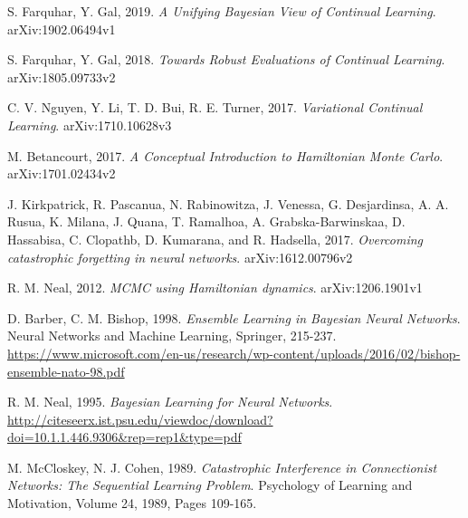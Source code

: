 \documentclass[a4paper,11pt]{article}
\begin{document}
 

\newpage
\begin{thebibliography}{8}

 S. Farquhar, Y. Gal, 2019. \textit{A Unifying Bayesian View of Continual Learning}. arXiv:1902.06494v1

 S. Farquhar, Y. Gal, 2018. \textit{Towards Robust Evaluations of Continual Learning}. arXiv:1805.09733v2

 C. V. Nguyen, Y. Li, T. D. Bui, R. E. Turner, 2017. \textit{Variational Continual Learning}. arXiv:1710.10628v3
 
 M. Betancourt, 2017. \textit{A Conceptual Introduction to Hamiltonian Monte Carlo}. arXiv:1701.02434v2

 J. Kirkpatrick, R. Pascanua, N. Rabinowitza, J. Venessa, G. Desjardinsa, A. A. Rusua, K. Milana, J. Quana, T. Ramalhoa, A. Grabska-Barwinskaa, D. Hassabisa, C. Clopathb, D. Kumarana, and R. Hadsella, 2017. \textit{Overcoming catastrophic forgetting in neural networks}. arXiv:1612.00796v2

 R. M. Neal, 2012. \textit{MCMC using Hamiltonian dynamics}. arXiv:1206.1901v1


 D. Barber, C. M. Bishop, 1998. \textit{Ensemble Learning in Bayesian Neural Networks}. Neural Networks and Machine Learning, Springer, 215-237. \url{https://www.microsoft.com/en-us/research/wp-content/uploads/2016/02/bishop-ensemble-nato-98.pdf}

 R. M. Neal, 1995. \textit{Bayesian Learning for Neural Networks}. \url{http://citeseerx.ist.psu.edu/viewdoc/download?doi=10.1.1.446.9306&rep=rep1&type=pdf}


 M. McCloskey, N. J. Cohen, 1989. \textit{Catastrophic Interference in Connectionist Networks: The Sequential Learning Problem}. Psychology of Learning and Motivation, Volume 24, 1989, Pages 109-165.

\end{thebibliography}
\end{document}
